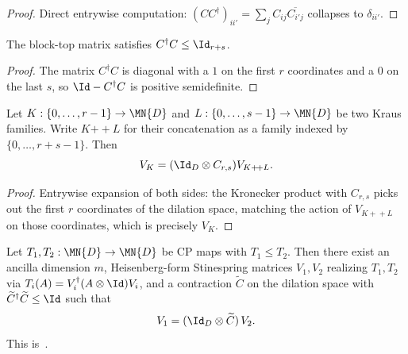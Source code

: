 \begin{proof}\leanok
    Direct entrywise computation: $(C C^\dagger)_{ii'} = \sum_j C_{ij}\overline{C_{i'j}}$
    collapses to $\delta_{ii'}$.
\end{proof}

\begin{lemma}[$C$ is a contraction]\label{lem:block_top_rows_contraction}
    \leanok
    The block-top matrix satisfies $C^\dagger C \le \Id_{r+s}$.
\end{lemma}

\begin{proof}\leanok
    The matrix $C^\dagger C$ is diagonal with a $1$ on the first $r$
    coordinates and a $0$ on the last $s$, so $\Id - C^\dagger C$ is
    positive semidefinite.
\end{proof}

\begin{lemma}\label{lem:stinespring_intertwine_append}
    \leanok
    Let $K : \{0,\ldots,r-1\} \to \MN{D}$ and $L : \{0,\ldots,s-1\} \to \MN{D}$
    be two Kraus families. Write $K\mathbin{+\!+}L$ for their concatenation
    as a family indexed by $\{0,\ldots,r+s-1\}$. Then
    \[
        V_K = (\Id_D \otimes C_{r,s}) V_{K + \! + L}.
    \]
\end{lemma}

\begin{proof}\leanok
    Entrywise expansion of both sides: the Kronecker product with $C_{r,s}$
    picks out the first $r$ coordinates of the dilation space, matching the
    action of $V_{K + \! + L}$ on those coordinates, which is precisely $V_K$.
\end{proof}

\begin{theorem}\label{thm:cp_dominates_stinespring_contraction}
    \leanok
    Let $T_1, T_2 : \MN{D} \to \MN{D}$ be CP maps with $T_1 \le T_2$.
    Then there exist an ancilla dimension $m$, Heisenberg-form Stinespring
    matrices $V_1, V_2$ realizing $T_1, T_2$ via
    $T_i(A) = V_i^\dagger (A \otimes \Id) V_i$, and a contraction
    $\widetilde C$ on the dilation space with $\widetilde C^\dagger
        \widetilde C \le \Id$ such that
    \[
        V_1 = (\Id_D \otimes \widetilde C)\, V_2.
    \]
    This is~\cite[Theorem~2.3]{Wolf2012Quantum}.
\end{theorem}

